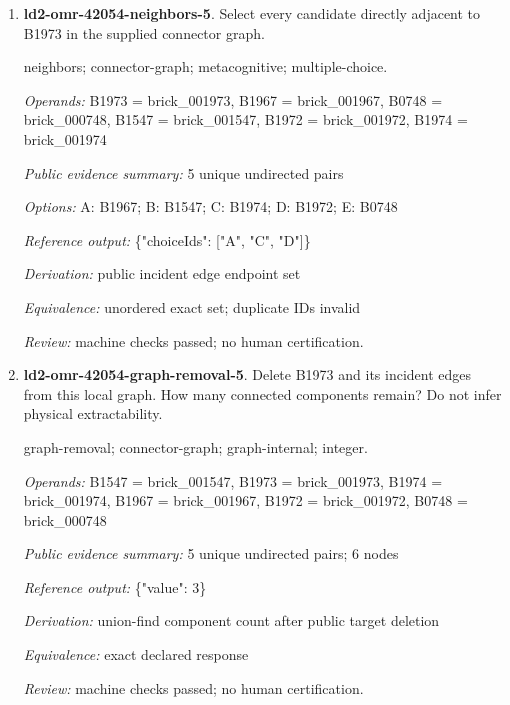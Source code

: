 \begin{enumerate}
\par{\small graph-removal; connector-graph; graph-internal; integer.\par\textit{Operands:} B0478 = brick\_000478, B0469 = brick\_000469, B0459 = brick\_000459, B1616 = brick\_001616, B0462 = brick\_000462, B0125 = brick\_000125, B0505 = brick\_000505, B0468 = brick\_000468, B0463 = brick\_000463\par\textit{Public evidence summary:} 6 unique undirected pairs; 9 nodes\par\textit{Reference output:} \{"value": 8\}\par\textit{Derivation:} union-find component count after public target deletion\par\textit{Equivalence:} exact declared response\par\textit{Review:} machine checks passed; no human certification.}
\item \textbf{ld2-omr-42054-neighbors-5}. Select every candidate directly adjacent to B1973 in the supplied connector graph.
\par{\small neighbors; connector-graph; metacognitive; multiple-choice.\par\textit{Operands:} B1973 = brick\_001973, B1967 = brick\_001967, B0748 = brick\_000748, B1547 = brick\_001547, B1972 = brick\_001972, B1974 = brick\_001974\par\textit{Public evidence summary:} 5 unique undirected pairs\par\textit{Options:} A: B1967; B: B1547; C: B1974; D: B1972; E: B0748\par\textit{Reference output:} \{"choiceIds": ["A", "C", "D"]\}\par\textit{Derivation:} public incident edge endpoint set\par\textit{Equivalence:} unordered exact set; duplicate IDs invalid\par\textit{Review:} machine checks passed; no human certification.}
\item \textbf{ld2-omr-42054-graph-removal-5}. Delete B1973 and its incident edges from this local graph. How many connected components remain? Do not infer physical extractability.
\par{\small graph-removal; connector-graph; graph-internal; integer.\par\textit{Operands:} B1547 = brick\_001547, B1973 = brick\_001973, B1974 = brick\_001974, B1967 = brick\_001967, B1972 = brick\_001972, B0748 = brick\_000748\par\textit{Public evidence summary:} 5 unique undirected pairs; 6 nodes\par\textit{Reference output:} \{"value": 3\}\par\textit{Derivation:} union-find component count after public target deletion\par\textit{Equivalence:} exact declared response\par\textit{Review:} machine checks passed; no human certification.}

\end{enumerate}
